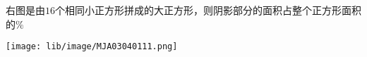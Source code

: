 右图是由$16$个相同小正方形拼成的大正方形，则阴影部分的面积占整个正方形面积的\key{}$\%$
\begin{center}
    \texttt{[image: lib/image/MJA03040111.png]}
\end{center}